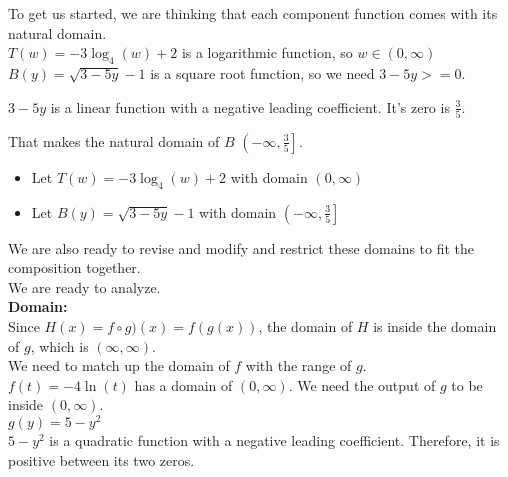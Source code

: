 \documentclass{ximera}
\begin{document}
To get us started, we are thinking that each component function comes with its natural domain. \\


$T(w) = -3 \log_4(w) + 2$ is a logarithmic function, so $w \in (0, \infty)$ \\


$B(y) = \sqrt{3 - 5y} - 1$ is a square root function, so we need $3 - 5y >= 0$.

$3 - 5y$ is a linear function with a negative leading coefficient.  It's zero is $\frac{3}{5}$.

That makes the natural domain of $B$ $\left(-\infty, \frac{3}{5} \right]$. \\



\begin{itemize}
\item Let $T(w) = -3 \log_4(w) + 2$ with domain $(0, \infty)$\\
\item Let $B(y) = \sqrt{3 - 5y} - 1$ with domain $\left(-\infty, \frac{3}{5} \right]$\\
\end{itemize}

We are also ready to revise and modify and restrict these domains to fit the composition together. \\




We are ready to analyze. \\




\textbf{\textcolor{blue!55!black}{Domain:}} \\



Since $H(x) = f \circ g)(x) = f(g(x))$, the domain of $H$ is inside the domain of $g$, which is $(\infty, \infty)$. \\

We need to match up the domain of $f$ with the range of $g$. \\


$f(t) = -4 \ln(t)$ has a domain of $(0, \infty)$.  We need the output of $g$ to be inside $(0, \infty)$. \\



$g(y) = 5 - y^2$ \\



$5 - y^2$ is a quadratic function with a negative leading coefficient.  Therefore, it is positive between its two zeros.
\end{document}
